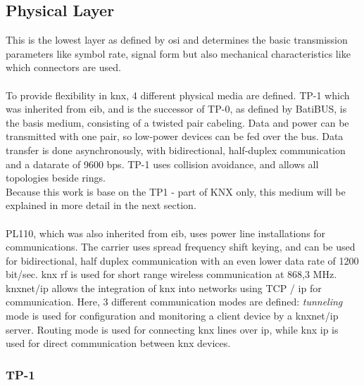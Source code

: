 \subsection{Physical Layer}
This is the lowest layer as defined by \gls{osi} and determines the basic transmission parameters like symbol rate, signal form but also mechanical 
characteristics like which connectors are used.
\\
\\
To provide flexibility in \gls{knx}, 4 different physical media are defined. \gls{TP}-1 which was inherited from \gls{eib}, and is the successor of \gls{TP}-0,
as defined by BatiBUS, is the basis medium, consisting of a twisted pair cabeling. Data and power can be transmitted with one pair, so low-power
devices can be fed over the bus. Data transfer is done asynchronously, with bidirectional, half-duplex
communication and a datarate of 9600 \gls{bps}. \gls{TP}-1 uses collision avoidance, and allows all topologies beside rings. 
\\
Because this work is base on the \gls{TP}1 - part of KNX only, this medium will be explained in more detail in the next section.
\\
\\
PL110, which was also inherited from \gls{eib}, uses power line installations for communications. The carrier uses spread frequency shift keying, and can be used 
for bidirectional, half duplex  communication with an even lower data rate of 1200 bit/sec. \gls{knx} \gls{rf} is used for short range wireless communication
at 868,3 MHz. \gls{knx}net/\gls{ip} allows the integration of \gls{knx} into networks using \gls{TCP} / \gls{ip} for communication. Here, 3 different communication
modes are defined: \textit{tunneling} mode is used for configuration and monitoring a client device by a \gls{knx}net/\gls{ip} server. Routing mode is used
for connecting \gls{knx} lines over \gls{ip}, while \gls{knx} \gls{ip} is used for direct communication between \gls{knx} devices. \cite{KraInnosec2013}

\subsubsection{TP-1}


